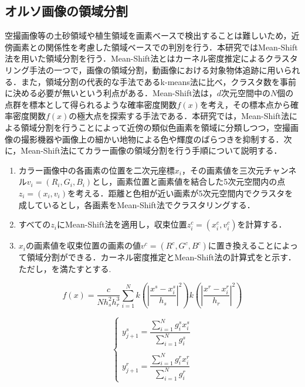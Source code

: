     \subsection{オルソ画像の領域分割}
      \label{オルソ画像の領域分割}
      空撮画像等の土砂領域や植生領域を画素ベースで検出することは難しいため，近傍画素との関係性を考慮した領域ベースでの判別を行う．本研究ではMean-Shift法\cite{Mean-Shift法1, Mean-Shift法2}を用いた領域分割を行う．Mean-Shift法とはカーネル密度推定によるクラスタリング手法の一つで，画像の領域分割，動画像における対象物体追跡に用いられる．また，領域分割の代表的な手法であるk-means法\cite{k-means法}に比べ，クラスタ数を事前に決める必要が無いという利点がある．Mean-Shift法は，$d$次元空間中の$N$個の点群を標本として得られるような確率密度関数$f(x)$を考え，その標本点から確率密度関数$f(x)$の極大点を探索する手法である．本研究では，Mean-Shift法による領域分割を行うことによって近傍の類似色画素を領域に分類しつつ，空撮画像の撮影機器や画像上の細かい地物による色や輝度のばらつきを抑制する．次に，Mean-Shift法にてカラー画像の領域分割を行う手順について説明する．

      \begin{enumerate}
        \setlength{\itemsep}{-5pt}
        \item カラー画像中の各画素の位置を二次元座標$x_i$，その画素値を三次元チャンネル$v_{i} =(R_{i},G_{i},B_{i})$とし，画素位置と画素値を結合した5次元空間内の点$z_{i} = (x_{i}, v_{i})$を考える．距離と色相が近い画素が5次元空間内でクラスタを成しているとし，各画素をMean-Shift法でクラスタリングする．
        \item すべての$z_{i}$にMean-Shift法を適用し，収束位置$z_{i}^c = (x_{i}^c , v_{i}^c)$を計算する．
        \item $x_{i}$の画素値を収束位置の画素の値$v^c = (R^c, G^c, B^c)$に置き換えることによって領域分割ができる．カーネル密度推定とMean-Shift法の計算式をと示す．ただし，を満たすとする.
      \end{enumerate}
    
      \begin{equation}
        \label{Mean-Shift法1}
        f(x) = \dfrac{c} {N h_{s}^2 h_{r}^3}
          \sum_{i=1}^{N}
          k (|\dfrac{x^s - x_{i}^s} {h_{s}}|^2) k (|\dfrac{x^r - x_{i}^r} {h_{r}}|^2)
      \end{equation}

      \begin{equation}
        \label{Mean-Shift法2}
        \left\{
          \begin{array}{l}
            y_{j+1}^s = 
              \dfrac{\sum_{i=1}^{N} g_{i}^s x_{i}^s} {\sum_{i=1}^{N} g_{i}^s} \\ \\
            y_{j+1}^r = 
              \dfrac{\sum_{i=1}^{N} g_{i}^r x_{i}^r} {\sum_{i=1}^{N} g_{i}^r}
          \end{array}
        \right.
      \end{equation}

